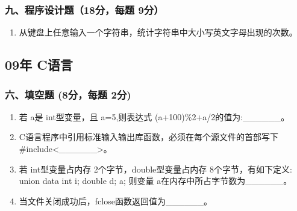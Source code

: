 \documentclass[12pt,a4paper]{article}
\begin{document}
\subsubsection*{九、程序设计题（18分，每题 9分）}
\begin{enumerate}
    \item 从键盘上任意输入一个字符串，统计字符串中大小写英文字母出现的次数。
\end{enumerate}

\subsection*{09年 C语言}
\subsubsection*{六、填空题 (8分，每题 2分)}
\begin{enumerate}
    \item 若 a是 int型变量，且 a=5,则表达式 (a+100)\%2+a/2的值为:\_\_\_\_\_\_。
    \item C语言程序中引用标准输入输出库函数，必须在每个源文件的首部写下 \#include<\_\_\_\_\_\_>。
    \item 若 int型变量占内存 2个字节，double型变量占内存 8个字节，有如下定义: union data { int i; double d; }a; 则变量 a在内存中所占字节数为\_\_\_\_\_\_。
    \item 当文件关闭成功后，fclose函数返回值为\_\_\_\_\_\_。
\end{enumerate}
\end{document}
